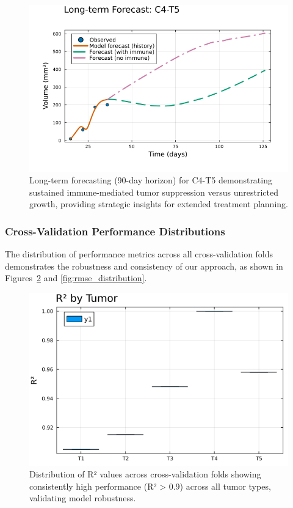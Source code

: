 \documentclass{juliacon}
\begin{document}
\begin{figure}[H]\centering
\includegraphics[width=\linewidth]{forecast_long.png}
\caption{Long-term forecasting (90-day horizon) for C4-T5 demonstrating sustained immune-mediated tumor suppression versus unrestricted growth, providing strategic insights for extended treatment planning.}
\label{fig:c4t5_long_forecast}
\end{figure}

\subsubsection{Cross-Validation Performance Distributions}

The distribution of performance metrics across all cross-validation folds demonstrates the robustness and consistency of our approach, as shown in Figures~\ref{fig:r2_distribution} and \ref{fig:rmse_distribution}.

\begin{figure}[H]\centering
\includegraphics[width=0.8\linewidth]{r2_summary.png}
\caption{Distribution of R² values across cross-validation folds showing consistently high performance (R² > 0.9) across all tumor types, validating model robustness.}
\label{fig:r2_distribution}
\end{figure}
\end{document}
